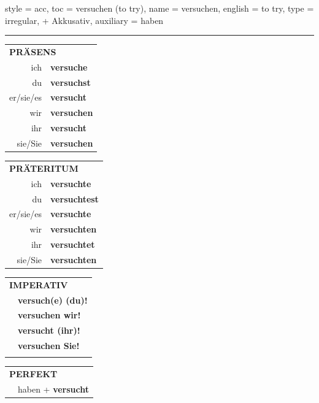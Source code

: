 \begin{verbentry}{
  style = {acc},
  toc = {versuchen (to try)},
  name = {versuchen},
  english = {to try},
  type = {irregular, + Akkusativ},
  auxiliary = {haben}
}
 
    
     \vspace{5pt}

    \hrule
    
    \vspace{5pt}

  \begin{tabular}{rl}
     \multicolumn{2}{l}{\textbf{PRÄSENS} }\\
    ich & \textbf{versuche}\\
    du & \textbf{versuchst}\\
    er/sie/es & \textbf{versucht}\\
    wir & \textbf{versuchen}\\
    ihr & \textbf{versucht}\\
    sie/Sie & \textbf{versuchen}\\
  \end{tabular}
  \hfill
     \begin{tabular}{rl}
    \multicolumn{2}{l}{\textbf{PRÄTERITUM} }\\
    ich & \textbf{versuchte}\\
    du & \textbf{versuchtest}\\
    er/sie/es & \textbf{versuchte}\\
    wir & \textbf{versuchten}\\
    ihr & \textbf{versuchtet}\\
    sie/Sie & \textbf{versuchten}\\
  \end{tabular}
  \hfill
  \begin{tabular}{rl}
     \multicolumn{2}{l}{\textbf{IMPERATIV} }\\
   & \textbf{versuch(e) (du)!}\\
   & \textbf{versuchen wir!}\\
   & \textbf{versucht (ihr)!}\\
   & \textbf{versuchen Sie!}\\
   & \vspace{10pt}
  \end{tabular}

    \vspace{10pt}

 \begin{tabular}{rl}
     \multicolumn{2}{l}{\textbf{PERFEKT}}\\
  &  haben + \textbf{versucht}\\
  \end{tabular}
\hfill
   \begin{tabular}{rl}
   

\end{tabular}
\end{verbentry}
